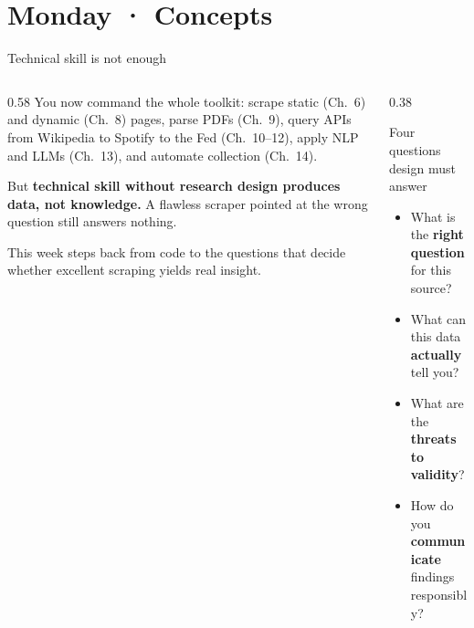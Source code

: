\documentclass[9pt,aspectratio=169]{beamer}
\begin{document}
\section{Monday · Concepts}

\begin{frame}{Technical skill is not enough}
    \begin{columns}[T]
        \begin{column}{0.58\textwidth}
            You now command the whole toolkit: scrape static (Ch.~6) and dynamic (Ch.~8) pages, parse PDFs (Ch.~9), query APIs from Wikipedia to Spotify to the Fed (Ch.~10--12), apply NLP and LLMs (Ch.~13), and automate collection (Ch.~14).

            \vspace{0.8em}

            But \textbf{technical skill without research design produces data, not knowledge.} A flawless scraper pointed at the wrong question still answers nothing.

            \vspace{0.8em}

            This week steps back from code to the questions that decide whether excellent scraping yields real insight.
        \end{column}
        \begin{column}{0.38\textwidth}
            \begin{alertblock}{Four questions design must answer}
                \footnotesize
                \begin{itemize}\footnotesize
                    \item What is the \textbf{right question} for this source?
                    \item What can this data \textbf{actually} tell you?
                    \item What are the \textbf{threats to validity}?
                    \item How do you \textbf{communicate} findings responsibly?
                \end{itemize}
            \end{alertblock}
        \end{column}
    \end{columns}
\end{frame}
\end{document}
